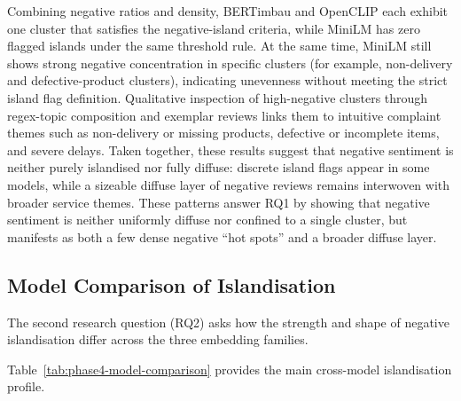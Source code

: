 \documentclass[a4paper,11pt]{article}
\begin{document}
Combining negative ratios and density, BERTimbau and OpenCLIP each exhibit one cluster that satisfies the negative-island criteria, while MiniLM has zero flagged islands under the same threshold rule. 
At the same time, MiniLM still shows strong negative concentration in specific clusters (for example, non-delivery and defective-product clusters), indicating unevenness without meeting the strict island flag definition. 
Qualitative inspection of high-negative clusters through regex-topic composition and exemplar reviews links them to intuitive complaint themes such as non-delivery or missing products, defective or incomplete items, and severe delays. 
Taken together, these results suggest that negative sentiment is neither purely islandised nor fully diffuse: discrete island flags appear in some models, while a sizeable diffuse layer of negative reviews remains interwoven with broader service themes.
These patterns answer RQ1 by showing that negative sentiment is neither uniformly diffuse nor confined to a single cluster, but manifests as both a few dense negative ``hot spots'' and a broader diffuse layer.

\subsection{Model Comparison of Islandisation}

The second research question (RQ2) asks how the strength and shape of negative islandisation differ across the three embedding families.

Table~\ref{tab:phase4-model-comparison} provides the main cross-model islandisation profile.

\begin{table}[tbp]
\centering
\small
\caption{Main islandisation metrics by embedding model.}
\label{tab:phase4-model-comparison}
\end{table}
\end{document}

